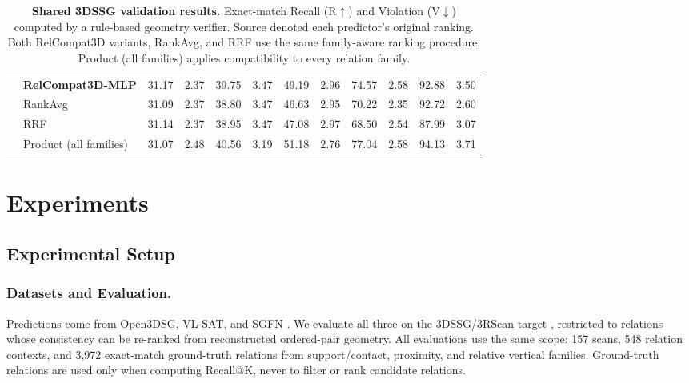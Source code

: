 \documentclass[letterpaper]{article}
\begin{document}
\begin{table}[!t]
{\begin{tabular}{@{}llrrrrrrrrrr@{}}
& \textbf{RelCompat3D-MLP} & 31.17 & 2.37 & 39.75 & 3.47 & 49.19 & 2.96 & 74.57 & 2.58 & 92.88 & 3.50 \\
& RankAvg & 31.09 & 2.37 & 38.80 & 3.47 & 46.63 & 2.95 & 70.22 & 2.35 & 92.72 & 2.60 \\
& RRF & 31.14 & 2.37 & 38.95 & 3.47 & 47.08 & 2.97 & 68.50 & 2.54 & 87.99 & 3.07 \\
& Product (all families) & 31.07 & 2.48 & 40.56 & 3.19 & 51.18 & 2.76 & 77.04 & 2.58 & 94.13 & 3.71 \\
\bottomrule
\end{tabular}
}
\caption{\textbf{Shared 3DSSG validation results.} Exact-match Recall (R$\uparrow$) and Violation (V$\downarrow$) computed by a rule-based geometry verifier. Source denoted each predictor's original ranking. Both RelCompat3D variants, RankAvg, and RRF use the same family-aware ranking procedure; Product (all families) applies compatibility to every relation family.}
\label{tab:main-results}
\end{table}

\section{Experiments}
\subsection{Experimental Setup}
\subsubsection{Datasets and Evaluation.}
Predictions come from Open3DSG, VL-SAT, and SGFN \cite{wang2023vl,koch2024open3dsg,wu2021scenegraphfusion}. We evaluate all three on the 3DSSG/3RScan target \cite{wald2019rio,wald2020learning}, restricted to relations whose consistency can be re-ranked from reconstructed ordered-pair geometry. All evaluations use the same scope: 157 scans, 548 relation contexts, and 3,972 exact-match ground-truth relations from support/contact, proximity, and relative vertical families. Ground-truth relations are used only when computing Recall@K, never to filter or rank candidate relations.
\end{document}
